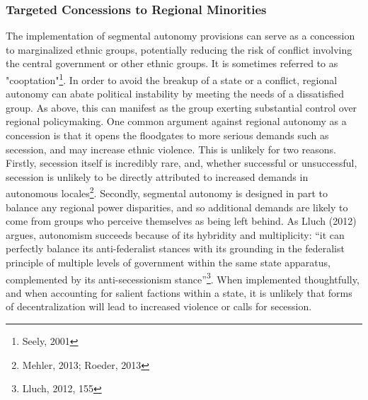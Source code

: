 \documentclass[12pt]{article}
\begin{document}
\subsubsection{Targeted Concessions to Regional Minorities}
The implementation of segmental autonomy provisions can serve as a concession to marginalized ethnic groups, potentially reducing the risk of conflict involving the central government or other ethnic groups. It is sometimes referred to as "cooptation"\footnote{Seely, 2001}. In order to avoid the breakup of a state or a conflict, regional autonomy can abate political instability by meeting the needs of a dissatisfied group. As above, this can manifest as the group exerting substantial control over regional policymaking. One common argument against regional autonomy as a concession is that it opens the floodgates to more serious demands such as secession, and may increase ethnic violence. This is unlikely for two reasons. Firstly, secession itself is incredibly rare, and, whether successful or unsuccessful, secession is unlikely to be directly attributed to increased demands in autonomous locales\footnote{Mehler, 2013; Roeder, 2013}. Secondly, segmental autonomy is designed in part to balance any regional power disparities, and so additional demands are likely to come from groups who perceive themselves as being left behind. As Lluch (2012) argues, autonomism succeeds because of its hybridity and multiplicity: “it can perfectly balance its anti-federalist stances with its grounding in the federalist principle of multiple levels of government within the same state apparatus, complemented by its anti-secessionism stance”\footnote{Lluch, 2012, 155}. When implemented thoughtfully, and when accounting for salient factions within a state, it is unlikely that forms of decentralization will lead to increased violence or calls for secession. 
\end{document}
